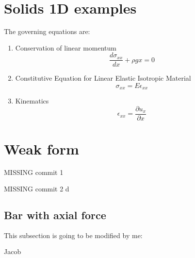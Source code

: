 \documentclass[letterpaper,11pt]{article}
\begin{document}
\section{Solids 1D examples}

The governing equations are:

\begin{enumerate}
\item Conservation of linear momentum
\begin{equation}
\frac{d \sigma_{xx}}{dx} + \rho g x = 0
\end{equation}
\item Constitutive Equation for Linear Elastic Isotropic Material
\begin{equation}
\sigma_{xx} = E \epsilon_{xx}
\end{equation}
\item Kinematics
\begin{equation}
\epsilon_{xx} = \frac{\partial u_x}{\partial x}
\end{equation}
\end{enumerate}

\section{Weak form}

MISSING commit 1

MISSING commit 2   d

\subsection{Bar with axial force}


This subsection is going to be modified by me:

\huge{Jacob}
\end{document}
